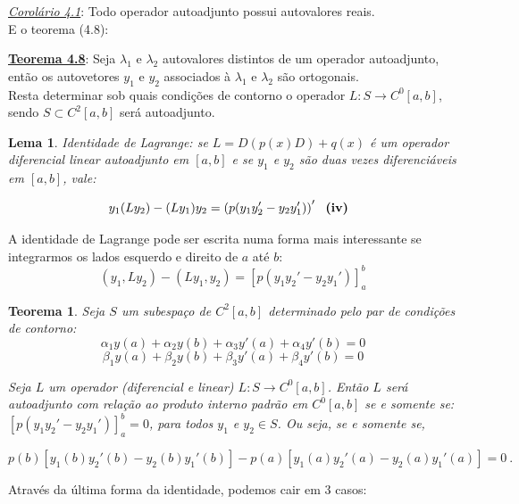 \documentclass[a4paper,portuguese,9pt,final]{extarticle}
\newtheorem{theorem}{Teorema}[section]
\newtheorem{lema}{Lema}[section]
\begin{document}
\begin{multicols*}{2}
    \underline{\textit{Corolário 4.1}}: Todo operador autoadjunto possui autovalores reais.\\

    E o teorema (4.8):

    \textbf{\underline{Teorema 4.8}}: Seja $ \lambda_{1} $ e $ \lambda_{2} $ autovalores distintos de um operador autoadjunto, então os autovetores $ y_{1} $ e $ y_{2} $ associados à $ \lambda_{1} $ e $ \lambda_{2} $ são ortogonais. \\

    Resta determinar sob quais condições de contorno o operador $L:S \rightarrow C^0 [a,b]$, sendo $S \subset C^2[a,b]$ será autoadjunto.

    \begin{lema}

        Identidade de Lagrange: se $ L=D\left(p(x)D\right) + q(x) $ é um operador diferencial linear autoadjunto em $ [a,b] $ e se $ y_{1} $ e $ y_{2} $ são duas vezes diferenciáveis em $ [a,b] $, vale:

        $$ y_{1}(Ly_{2}) - (Ly_{1})y_{2} = \left(p(y_{1}y_{2}'-y_{2}y_{1}')\right)' \mbox{ \ \textbf{(iv)} \ } $$
    \end{lema}

    A identidade de Lagrange pode ser escrita numa forma mais interessante se integrarmos os lados esquerdo e direito de $ a $ até $ b $:
    $$ (y_{1},Ly_{2}) - (Ly_{1},y_{2}) = \left[ p(y_{1}y_{2}' - y_{2}y_{1}') \right]_{a}^{b}  $$

    \begin{theorem}	
        
        Seja $ S $ um subespaço de $ C^{2}[a,b] $ determinado pelo par de condições de contorno:
        $$\alpha_{1} y(a) + \alpha_{2} y(b) + \alpha_{3} y'(a) + \alpha_{4} y'(b) = 0 $$
        $$\beta_{1} y(a) + \beta_{2} y(b) +\beta_{3} y'(a) + \beta_{4} y'(b) = 0 $$

        Seja $L$ um operador (diferencial e linear) $ L:S \to C^{0}[a,b] $. Então $L$ será autoadjunto com relação ao produto interno padrão em $ C^{0}[a,b] $ se e somente se:
        $ \left[ p(y_{1}y_{2}' - y_{2}y_{1}') \right]_{a}^{b} = 0 $, para todos $ y_{1}$ e $  y_{2} \in S $. Ou seja, se e somente se,


        $$ p(b)[y_{1}(b)y_{2}'(b)-y_{2}(b)y_{1}'(b)] - p(a)[y_{1}(a)y_{2}'(a)-y_{2}(a)y_{1}'(a)] = 0 \ .$$
    \end{theorem}

    Através da  última forma da identidade, podemos cair em 3 casos:


\end{multicols*}
\end{document}
